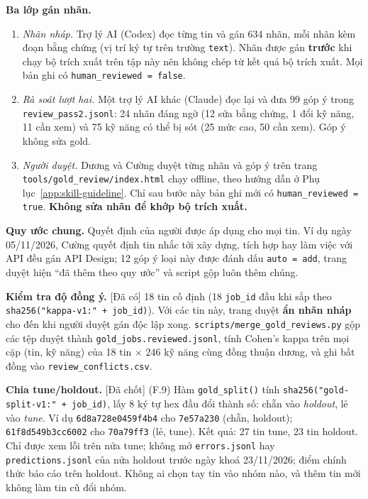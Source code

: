 \documentclass[12pt]{article}
\newcommand{\code}[1]{\texttt{#1}}
\newcommand{\dacoi}{\textsf{[Đã có]}}
\newcommand{\dachot}{\textsf{[Đã chốt]}}
\begin{document}
\textbf{Ba lớp gán nhãn.}
\begin{enumerate}[noitemsep, topsep=2pt, leftmargin=2.5em]
\item \textit{Nhãn nháp.} Trợ lý AI (Codex) đọc từng tin và gán 634 nhãn, mỗi nhãn kèm đoạn bằng chứng (vị trí ký tự trên trường \code{text}). Nhãn được gán \textbf{trước} khi chạy bộ trích xuất trên tập này nên không chép từ kết quả bộ trích xuất. Mọi bản ghi có \code{human\_reviewed = false}.
\item \textit{Rà soát lượt hai.} Một trợ lý AI khác (Claude) đọc lại và đưa 99 góp ý trong \code{review\_pass2.jsonl}: 24 nhãn đáng ngờ (12 sửa bằng chứng, 1 đổi kỹ năng, 11 cần xem) và 75 kỹ năng có thể bị sót (25 mức cao, 50 cần xem). Góp ý không sửa gold.
\item \textit{Người duyệt.} Dương và Cường duyệt từng nhãn và góp ý trên trang \code{tools/gold\_review/index.html} chạy offline, theo hướng dẫn ở Phụ lục~\ref{app:skill-guideline}. Chỉ sau bước này bản ghi mới có \code{human\_reviewed = true}. \textbf{Không sửa nhãn để khớp bộ trích xuất.}
\end{enumerate}

\textbf{Quy ước chung.} Quyết định của người được áp dụng cho mọi tin. Ví dụ ngày 05/11/2026, Cường quyết định tin nhắc tới xây dựng, tích hợp hay làm việc với API đều gán API Design; 12 góp ý loại này được đánh dấu \code{auto = add}, trang duyệt hiện ``đã thêm theo quy ước'' và script gộp luôn thêm chúng.

\textbf{Kiểm tra độ đồng ý.} \dacoi{} 18 tin cố định (18 \code{job\_id} đầu khi sắp theo \code{sha256("kappa-v1:" + job\_id)}). Với các tin này, trang duyệt \textbf{ẩn nhãn nháp} cho đến khi người duyệt gán độc lập xong. \code{scripts/merge\_gold\_reviews.py} gộp các tệp duyệt thành \code{gold\_jobs.reviewed.jsonl}, tính Cohen's kappa trên mọi cặp (tin, kỹ năng) của 18 tin $\times$ 246 kỹ năng cùng đồng thuận dương, và ghi bất đồng vào \code{review\_conflicts.csv}.

\textbf{Chia tune/holdout.} \dachot{} (F.9) Hàm \code{gold\_split()} tính \code{sha256("gold-split-v1:" + job\_id)}, lấy 8 ký tự hex đầu đổi thành số: chẵn vào \textit{holdout}, lẻ vào \textit{tune}. Ví dụ \code{6d8a728e0459f4b4} cho \code{7e57a230} (chẵn, holdout); \code{61f8d549b3cc6002} cho \code{70a79ff3} (lẻ, tune). Kết quả: 27 tin tune, 23 tin holdout. Chỉ được xem lỗi trên nửa tune; không mở \code{errors.jsonl} hay \code{predictions.jsonl} của nửa holdout trước ngày khoá 23/11/2026; điểm chính thức báo cáo trên holdout. Không ai chọn tay tin vào nhóm nào, và thêm tin mới không làm tin cũ đổi nhóm.
\end{document}

